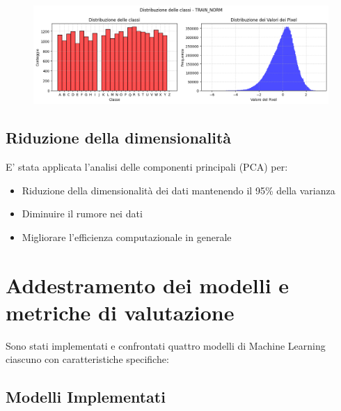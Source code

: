 \documentclass{article}
\begin{document}
\begin{figure}[H]
    \centering
    \includegraphics[scale=0.5]{Figures/output8.png}\label{fig:dataset_preprocessing}
\end{figure}

\subsection{Riduzione della dimensionalità}
E' stata applicata l'analisi delle componenti principali (PCA) per:
\begin{itemize}
    \item Riduzione della dimensionalità dei dati mantenendo il 95\% della varianza
    \item Diminuire il rumore nei dati
    \item Migliorare l'efficienza computazionale in generale
\end{itemize}

\clearpage

\section{Addestramento dei modelli e metriche di valutazione}

Sono stati implementati e confrontati quattro modelli di Machine Learning ciascuno 
con caratteristiche specifiche: 

\subsection{Modelli Implementati}
\end{document}
